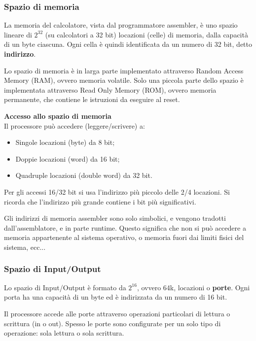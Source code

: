 \documentclass[a4paper,11pt]{article}
\begin{document}
\subsubsection{Spazio di memoria}
La memoria del calcolatore, vista dal programmatore assembler, è uno spazio lineare di $2^{32}$ (su calcolatori a 32 bit) locazioni (celle) di memoria, dalla capacità di un byte ciascuna.
Ogni cella è quindi identificata da un numero di 32 bit, detto \textbf{indirizzo}.

\par\smallskip

Lo spazio di memoria è in larga parte implementato attraverso Random Access Memory (RAM), ovvero memoria volatile.
Solo una piccola parte dello spazio è implementata attraverso Read Only Memory (ROM), ovvero memoria permanente, che contiene le istruzioni da eseguire al reset.

\par\medskip
\noindent
\textbf{\textsf{Accesso allo spazio di memoria}} \\
Il processore può accedere (leggere/scrivere) a:
\begin{itemize}
	\item Singole locazioni (byte) da 8 bit;
	\item Doppie locazioni (word) da 16 bit;
	\item Quadruple locazioni (double word) da 32 bit.
\end{itemize}

Per gli accessi 16/32 bit si usa l'indirizzo più piccolo delle 2/4 locazioni.
Si ricorda che l'indirizzo più grande contiene i bit più significativi.

Gli indirizzi di memoria assembler sono solo simbolici, e vengono tradotti dall'assemblatore, e in parte runtime.
Questo significa che non si può accedere a memoria appartenente al sistema operativo, o memoria fuori dai limiti fisici del sistema, ecc...

\subsubsection{Spazio di Input/Output}
Lo spazio di Input/Output è formato da $2^{16}$, ovvero 64k, locazioni o \textbf{porte}.
Ogni porta ha una capacità di un byte ed è indirizzata da un numero di 16 bit.

Il processore accede alle porte attraverso operazioni particolari di lettura o scrittura (in o out).
Spesso le porte sono configurate per un solo tipo di operazione: sola lettura o sola scrittura.
\end{document}
